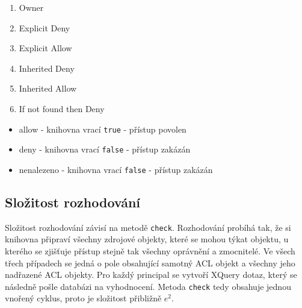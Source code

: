 \begin{enumerate}
\item Owner
\item Explicit Deny
\item Explicit Allow
\item Inherited Deny
\item Inherited Allow
\item If not found then Deny
\end{enumerate}

\begin{itemize}
\item allow - knihovna vrací \verb|true| - přístup povolen
\item deny - knihovna vrací \verb|false| - přístup zakázán
\item nenalezeno - knihovna vrací \verb|false| - přístup zakázán
\end{itemize}

\subsection{Složitost rozhodování}
Složitost rozhodování závisí na metodě \verb|check|. 
Rozhodování probíhá tak, že si knihovna připraví všechny zdrojové objekty, které se mohou týkat objektu, u kterého se zjišťuje přístup stejně tak všechny oprávnění a zmocnitelé. Ve všech třech případech se jedná o pole obsahující samotný ACL objekt a všechny jeho nadřazené ACL objekty. Pro každý principal se vytvoří XQuery dotaz, který se následně pošle databázi na vyhodnocení. Metoda \verb|check| tedy obsahuje jednou vnořený cyklus, proto je složitost přibližně $e^2$.
